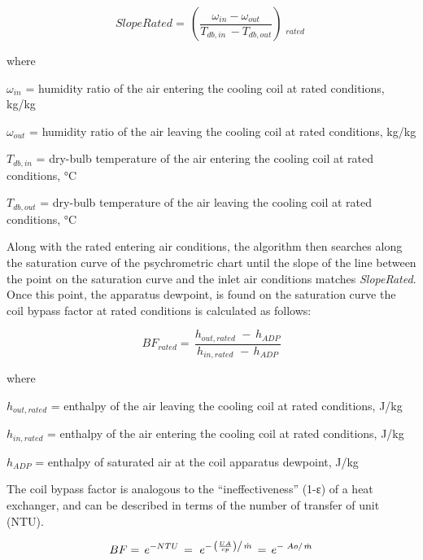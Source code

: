 \begin{equation}
SlopeRated = \,\left( {\frac{{{\omega_{in}} - {\omega_{out}}}}{{{T_{db,in}}\, - {T_{db,out}}}}} \right)\mathop {}\limits_{rated}
\end{equation}

where

\(\omega_{in}\) = humidity ratio of the air entering the cooling coil at rated conditions, kg/kg

\(\omega_{out}\) = humidity ratio of the air leaving the cooling coil at rated conditions, kg/kg

\(T_{db,in}\) = dry-bulb temperature of the air entering the cooling coil at rated conditions, °C

\(T_{db,out}\) = dry-bulb temperature of the air leaving the cooling coil at rated conditions, °C

Along with the rated entering air conditions, the algorithm then searches along the saturation curve of the psychrometric chart until the slope of the line between the point on the saturation curve and the inlet air conditions matches \emph{SlopeRated}. Once this point, the apparatus dewpoint, is found on the saturation curve the coil bypass factor at rated conditions is calculated as follows:

\begin{equation}
B{F_{rated}} = \,\frac{{{h_{out,rated}}\,\, - \,{h_{ADP}}}}{{{h_{in,rated}}\,\, - \,{h_{ADP}}}}
\end{equation}

where

\(h_{out,rated}\) = enthalpy of the air leaving the cooling coil at rated conditions, J/kg

\(h_{in,rated}\) = enthalpy of the air entering the cooling coil at rated conditions, J/kg

\(h_{ADP}\) = enthalpy of saturated air at the coil apparatus dewpoint, J/kg

The coil bypass factor is analogous to the ``ineffectiveness'' (1-ε) of a heat exchanger, and can be described in terms of the number of transfer of unit (NTU).

\begin{equation}
BF = \,{e^{ - NTU}}\, = \,\,{e^{ - \,{{\left( {\frac{{UA}}{{cp}}} \right)} \mathord{\left/ {\vphantom {{\left( {\frac{{UA}}{{cp}}} \right)} {\dot m}}} \right. } {\dot m}}}}\, = \,{e^{ - \,\,{{Ao} \mathord{\left/ {\vphantom {{Ao} {\dot m}}} \right. } {\dot m}}}}
\end{equation}

